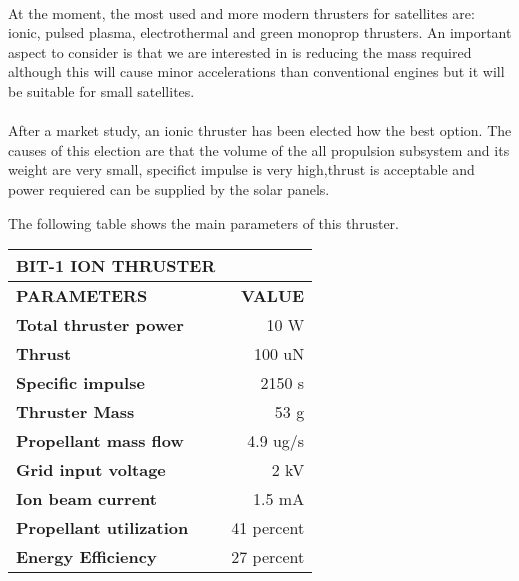\paragraph{}
At the moment, the most used and more modern thrusters for satellites are: ionic, pulsed plasma, electrothermal and green monoprop thrusters. An important aspect to consider is that we are interested in is reducing the mass required although this will cause minor accelerations than conventional engines but it will be suitable for small satellites.

\paragraph{}
After a market study, an ionic thruster has been elected how the best option. The causes of this election are that the volume of the all propulsion subsystem and its weight are very small, specifict impulse is very high,thrust is acceptable and power requiered can be supplied by the solar panels.

The following table shows the main parameters of this thruster.

\begin{longtable}{| l | r |}

\hline
\rowcolor[gray]{0.60}	\textbf{BIT-1 ION THRUSTER} \\
\hline

\hline
\rowcolor[gray]{0.75}	\textbf{PARAMETERS} &  \textbf{VALUE}   \\
\hline

\cellcolor[gray]{0.85} \textbf{Total thruster power} & 10 W  \\
\cellcolor[gray]{0.85} \textbf{Thrust} & 100 uN \\
\cellcolor[gray]{0.85} \textbf{Specific impulse} & 2150 s \\
\cellcolor[gray]{0.85} \textbf{Thruster Mass} & 53 g \\
\cellcolor[gray]{0.85} \textbf{Propellant mass flow} & 4.9 ug/s \\
\cellcolor[gray]{0.85} \textbf{Grid input voltage} & 2 kV \\
\cellcolor[gray]{0.85} \textbf{Ion beam current} & 1.5 mA \\
\cellcolor[gray]{0.85} \textbf{Propellant utilization} & 41 percent \\
\cellcolor[gray]{0.85} \textbf{Energy Efficiency} & 27 percent \\
\hline

\end{longtable}


